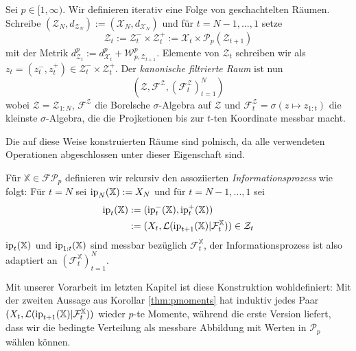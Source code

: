 \begin{definition}
    Sei $p \in [1, \infty)$. Wir definieren iterativ eine Folge von geschachtelten Räumen. Schreibe $(\mathcal{Z}_N, d_{\mathcal{Z}_N}) := (\mathcal{X}_N, d_{\mathcal{X}_N})$ und für $t=N-1, ..., 1$ setze
    \begin{equation}
        \mathcal{Z}_t := \mathcal{Z}_t^- \times \mathcal{Z}_t^+ := \mathcal{X}_t \times \mathcal{P}_p(\mathcal{Z}_{t+1})
    \end{equation}
    mit der Metrik $d^p_{\mathcal{Z}_t} := d^p_{\mathcal{X}_t} + \mathcal{W}^p_{p, \mathcal{Z}_{t+1}}$. Elemente von $\mathcal{Z}_t$ schreiben wir als $z_t=(z_t^-, z_t^+) \in \mathcal{Z}_t^- \times \mathcal{Z}_t^+$. Der \emph{kanonische filtrierte Raum} ist nun
    \begin{equation}
        (\mathcal{Z}, \mathcal{F}^\mathcal{Z}, (\mathcal{F}_t^\mathcal{Z})_{t=1}^N)
    \end{equation}
    wobei $\mathcal{Z} = \mathcal{Z}_{1:N}$, $\mathcal{F}^\mathcal{Z}$ die Borelsche $\sigma$-Algebra auf $\mathcal{Z}$ und $\mathcal{F}^\mathcal{Z}_t=\sigma(z \mapsto z_{1:t})$ die kleinste $\sigma$-Algebra, die die Projketionen bis zur $t$-ten Koordinate messbar macht.
\end{definition}
Die auf diese Weise konstruierten Räume sind polnisch, da alle verwendeten Operationen abgeschlossen unter dieser Eigenschaft sind.
\begin{definition}
Für $\mathbb{X}\in \mathcal{FP}_p$ definieren wir rekursiv den assoziierten \emph{Informationsprozess} wie folgt: Für $t=N$ sei $\operatorname{ip}_N(\mathbb{X}):=X_N$ und für $t=N-1,...,1$ sei
\begin{align*}
   \operatorname{ip}_t(\mathbb{X})&:=(\operatorname{ip}_t^-(\mathbb{X}), \operatorname{ip}_t^+(\mathbb{X})) \\
   &:= (X_t, \mathcal{L}(\operatorname{ip}_{t+1}(\mathbb{X}) \vert \mathcal{F}_t^{\mathbb{X}})) \in \mathcal{Z}_t
\end{align*}
$\operatorname{ip}_t(\mathbb{X})$ und $\operatorname{ip}_{1:t}(\mathbb{X})$ sind messbar bezüglich $\mathcal{F}_t^\mathbb{X}$, der Informationsprozess ist also adaptiert an $\left(\mathcal{F}_t^\mathbb{X}\right)_{t=1}^N$.
\end{definition}
\begin{remark}
Mit unserer Vorarbeit im letzten Kapitel ist diese Konstruktion wohldefiniert: Mit der zweiten Aussage aus Korollar \ref{thm:pmoments} hat induktiv jedes Paar $(X_t, \mathcal{L}(\operatorname{ip}_{t+1}(\mathbb{X})\vert \mathcal{F}_t^\mathbb{X}))$ wieder $p$-te Momente, während die erste Version liefert, dass wir die bedingte Verteilung als messbare Abbildung mit Werten in $\mathcal{P}_p$ wählen können.
\end{remark}
